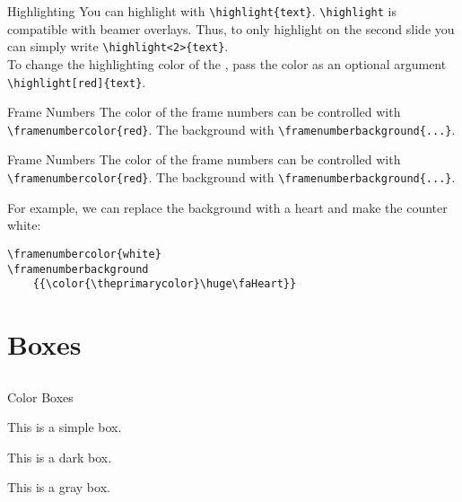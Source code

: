 \documentclass{beamer}
\begin{document}
\begin{frame}[fragile]{Highlighting}
    You can highlight  with \verb|\highlight{text}|. \verb|\highlight| is compatible 
    with beamer overlays. Thus, to only highlight \highlight<2>{text} on the second slide you can 
    simply write \verb|\highlight<2>{text}|.\\[2em]


    To change the highlighting color of the , pass the color 
    as an optional argument \verb|\highlight[red]{text}|.
\end{frame}

\begin{frame}[fragile]{Frame Numbers}
    The color of the frame numbers can be controlled with 
    \verb|\framenumbercolor{red}|. The background with
    \verb|\framenumberbackground{...}|.
\end{frame}

{
    \framenumberbackground
    {{\color{\theprimarycolor}\huge\faHeart}}
\begin{frame}[fragile]{Frame Numbers}
    The color of the frame numbers can be controlled with 
    \verb|\framenumbercolor{red}|. The background with
    \verb|\framenumberbackground{...}|.\vspace{2em}

    For example, we can replace the background with a heart and 
    make the counter white:
    \begin{verbatim}
\framenumbercolor{white}
\framenumberbackground
    {{\color{\theprimarycolor}\huge\faHeart}}
    \end{verbatim}
\end{frame}
}

\section{Boxes}
\subsection{}

\begin{frame}{Color Boxes}
    \begin{defaultbox}
        This is a simple box.
    \end{defaultbox}

    \begin{darkbox}
        This is a dark box.
    \end{darkbox}

    \begin{graybox}
        This is a gray box.
    \end{graybox}
\end{frame}
\end{document}
